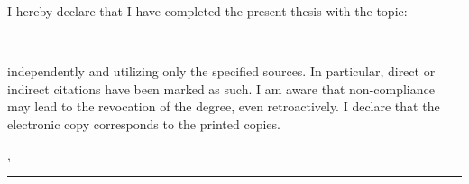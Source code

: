 I hereby declare that I have completed the present thesis with the topic:

\begin{center}
\textit{\glqq\titel\grqq}\\[1em]
\end{center}
			
independently and utilizing only the specified sources. In particular, direct or indirect citations have been marked as such. I am aware that non-compliance may lead to the revocation of the degree, even retroactively. I declare that the electronic copy corresponds to the printed copies.
\par
\ort, \eingereicht


\rule[-0.2cm]{5cm}{0.5pt}

\textsc{\autor} 
